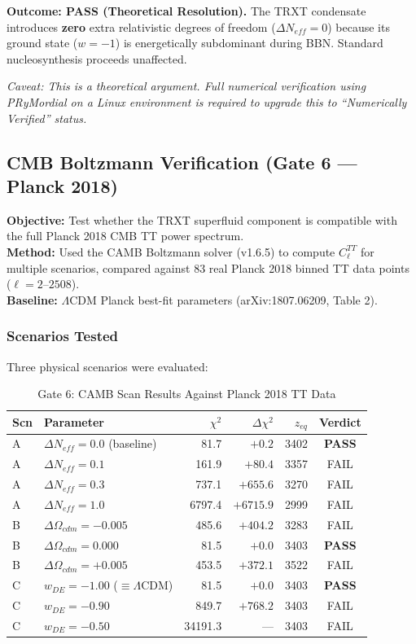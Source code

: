 \documentclass[a4paper,12pt]{article}
\begin{document}
\textbf{Outcome: PASS (Theoretical Resolution).} The TRXT condensate introduces \textbf{zero} extra relativistic degrees of freedom ($\Delta N_{eff} = 0$) because its ground state ($w = -1$) is energetically subdominant during BBN. Standard nucleosynthesis proceeds unaffected.

\textit{Caveat: This is a theoretical argument. Full numerical verification using PRyMordial on a Linux environment is required to upgrade this to ``Numerically Verified'' status.}

\subsection{CMB Boltzmann Verification (Gate 6 --- Planck 2018)}

\textbf{Objective:} Test whether the TRXT superfluid component is compatible with the full Planck 2018 CMB TT power spectrum.\\
\textbf{Method:} Used the CAMB Boltzmann solver (v1.6.5) to compute $C_\ell^{TT}$ for multiple scenarios, compared against 83 real Planck 2018 binned TT data points ($\ell = 2$--$2508$).\\
\textbf{Baseline:} $\Lambda$CDM Planck best-fit parameters (arXiv:1807.06209, Table 2).

\subsubsection{Scenarios Tested}
Three physical scenarios were evaluated:

\begin{table}[H]
\centering
\caption{Gate 6: CAMB Scan Results Against Planck 2018 TT Data}
\label{tab:gate6}
\begin{tabular}{@{}llrrrc@{}}
\toprule
\textbf{Scn} & \textbf{Parameter} & \textbf{$\chi^2$} & \textbf{$\Delta\chi^2$} & \textbf{$z_{eq}$} & \textbf{Verdict} \\
\midrule
A & $\Delta N_{eff} = 0.0$ (baseline) & 81.7 & $+0.2$ & 3402 & \textbf{PASS} \\
A & $\Delta N_{eff} = 0.1$ & 161.9 & $+80.4$ & 3357 & FAIL \\
A & $\Delta N_{eff} = 0.3$ & 737.1 & $+655.6$ & 3270 & FAIL \\
A & $\Delta N_{eff} = 1.0$ & 6797.4 & $+6715.9$ & 2999 & FAIL \\
\midrule
B & $\Delta\Omega_{cdm} = -0.005$ & 485.6 & $+404.2$ & 3283 & FAIL \\
B & $\Delta\Omega_{cdm} = 0.000$ & 81.5 & $+0.0$ & 3403 & \textbf{PASS} \\
B & $\Delta\Omega_{cdm} = +0.005$ & 453.5 & $+372.1$ & 3522 & FAIL \\
\midrule
C & $w_{DE} = -1.00$ ($\equiv \Lambda$CDM) & 81.5 & $+0.0$ & 3403 & \textbf{PASS} \\
C & $w_{DE} = -0.90$ & 849.7 & $+768.2$ & 3403 & FAIL \\
C & $w_{DE} = -0.50$ & 34191.3 & --- & 3403 & FAIL \\
\bottomrule
\end{tabular}
\end{table}
\end{document}
